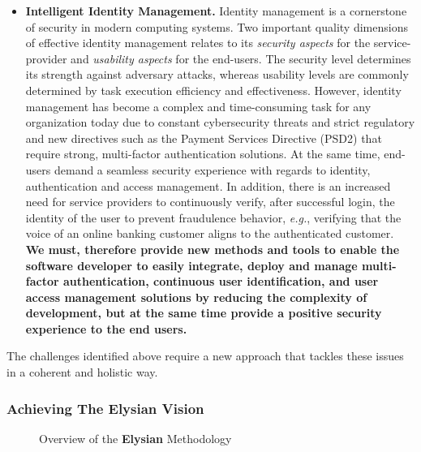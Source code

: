 \documentclass[a4paper,11pt]{article}
\newcommand{\project}[1]{\textbf{#1}\xspace}
\newcommand{\SECURITY}{\project{Elysian}}
\newcommand{\TheProject}{\SECURITY}
\begin{document}
\begin{itemize}
\item \textbf{Intelligent Identity Management.} 
Identity management is a cornerstone of security in modern computing systems. Two important quality dimensions of effective identity management relates to its \textit{security aspects} for the service-provider and \textit{usability aspects} for the end-users. The security level determines its strength against adversary attacks, whereas usability levels are commonly determined by task execution efficiency and effectiveness. However, identity management has become a complex and time-consuming task for any organization today due to constant cybersecurity threats and strict regulatory and new directives such as the Payment Services Directive (PSD2) that require strong, multi-factor authentication solutions. At the same time, end-users demand a seamless security experience with regards to identity, authentication and access management. In addition, there is an increased need for service providers to continuously verify, after successful login, the identity of the user to prevent fraudulence behavior, \textit{e.g.}, verifying that the voice of an online banking customer aligns to the authenticated customer. \textbf{We must, therefore provide new methods and tools to enable the software developer to easily integrate, deploy and manage multi-factor authentication, continuous user identification, and user access management solutions by reducing the complexity of development, but at the same time provide a positive security experience to the end users.}

\end{itemize}


The challenges identified above require a new approach that tackles these issues in a coherent and
holistic way. 

\subsubsection{Achieving The \TheProject{} Vision}
\label{sect:elysian_vision}

\begin{figure}[tph!]
  \begin{center}
  \vspace{-5mm}
  \caption{Overview of the \TheProject{} Methodology}
  \label{fig:overview}
  \end{center}
  \end{figure}
\end{document}
